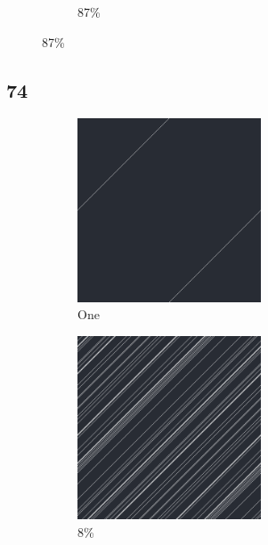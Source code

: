\documentclass[12pt, fleqn]{report}                             %
\theoremstyle{break}                                            %
\begin{document}
\begin{figure}[ht!]
\begin{subfigure}[b]{0.4\linewidth}
          \caption{87\%}
        \end{subfigure}
      \end{figure}


      \clearpage
      \subsection{74}
      \begin{figure}[ht!]
        \centering
        \begin{subfigure}[b]{0.4\linewidth}
          \includegraphics[width=0.6\textwidth]{Images/74/a.png}
          \caption{One}
        \end{subfigure}
        \begin{subfigure}[b]{0.4\linewidth}
          \includegraphics[width=0.6\textwidth]{Images/74/b.png}
          \caption{8\%}
        \end{subfigure}
        \begin{subfigure}[b]{0.4\linewidth}

\end{subfigure}
\end{figure}
\end{document}
